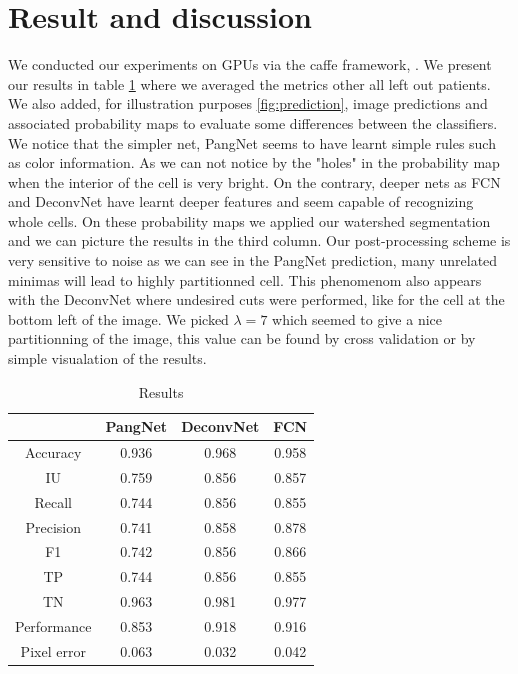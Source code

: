 \documentclass{article}
\begin{document}
\section{Result and discussion}
\label{sec:result}
\noindent We conducted our experiments on GPUs via the caffe framework, 
\cite{jia2014caffe}. We present our results in table \ref{tab:res} where 
we averaged the metrics other all left out patients. We also added, for 
illustration purposes \ref{fig:prediction}, image predictions and 
associated 
probability maps to evaluate some differences between the classifiers. 
We notice that the simpler net, PangNet seems to have learnt simple 
rules such as color information. As we can not notice by the "holes" in 
the probability map when the interior of the cell is very bright. On the 
contrary, deeper nets as FCN and DeconvNet have learnt deeper features 
and seem capable of recognizing whole cells. On these probability maps 
we applied our watershed segmentation and we can picture the results in 
the third 
column. Our post-processing 
scheme is very sensitive to noise as we can see in the PangNet 
prediction, many unrelated minimas will lead to highly partitionned cell. 
This phenomenom also appears with the DeconvNet where undesired 
cuts were performed, like for the cell at the bottom left of the image. 
We picked $\lambda = 7$ which seemed to give a nice partitionning of 
the image, this value can be found by cross validation or by simple 
visualation of the results.
\begin{table}
\begin{tabular}{|c|c|c|c|}
\hline
  & PangNet & DeconvNet & FCN \\
 \hline
Accuracy  &       0.936 & 0.968 &0.958  \\
IU   &    0.759 &     0.856 & 0.857 \\
Recall     &       0.744  &     0.856 & 0.855 \\
Precision   &       0.741 &     0.858 & 0.878\\
F1    &       0.742 &     0.856 & 0.866 \\
TP       &       0.744 &     0.856 & 0.855  \\
TN      &       0.963 &     0.981 &  0.977\\
Performance    &       0.853 &     0.918 & 0.916\\
Pixel error  &  0.063 &     0.032 & 0.042\\
\hline
\end{tabular}
\caption{Results}
\label{tab:res}
\end{table}
\end{document}
